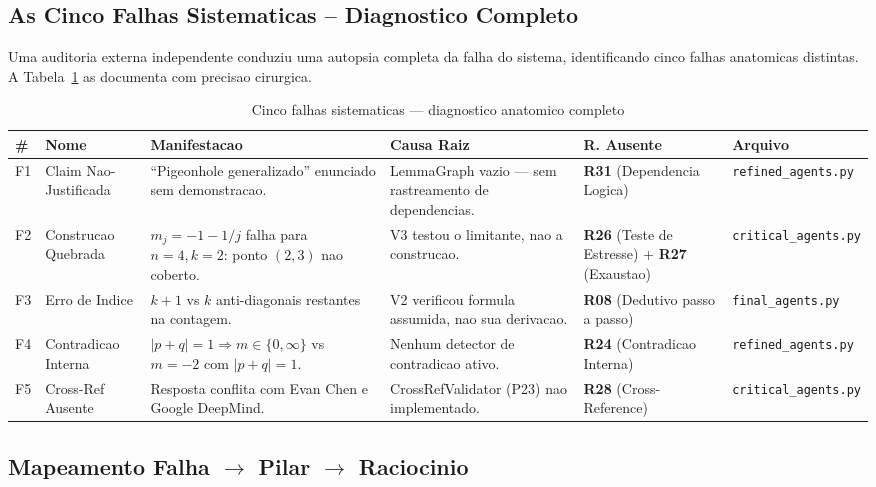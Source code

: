 \documentclass[5p]{elsarticle}
\begin{document}
\subsection{As Cinco Falhas Sistematicas -- Diagnostico Completo}

Uma auditoria externa independente \cite{corrigendum2026} conduziu uma autopsia
completa da falha do sistema, identificando cinco falhas anatomicas distintas.
A Tabela~\ref{tab:f5} as documenta com precisao cirurgica.


\begin{table}[H]
  \centering
  \caption{Cinco falhas sistematicas — diagnostico anatomico completo}
  \label{tab:f5}
  \scriptsize
  \setlength{\tabcolsep}{3pt}
  \begin{tabular}{p{0.3cm}p{1.5cm}p{3.2cm}p{3cm}p{2.2cm}p{2cm}}
    \toprule
    \textbf{\#} & \textbf{Nome} & \textbf{Manifestacao} & \textbf{Causa Raiz} & \textbf{R. Ausente} & \textbf{Arquivo}\\
    \midrule
    F1 & Claim Nao-Justificada & ``Pigeonhole generalizado'' enunciado sem demonstracao. & LemmaGraph vazio — sem rastreamento de dependencias. & \textbf{R31} (Dependencia Logica) & \texttt{refined\_agents.py}\\
    \rowcolor{yellowbg}
    F2 & Construcao Quebrada & $m_j=-1-1/j$ falha para $n=4,k=2$: ponto $(2,3)$ nao coberto. & V3 testou o limitante, nao a construcao. & \textbf{R26} (Teste de Estresse) + \textbf{R27} (Exaustao) & \texttt{critical\_agents.py}\\
    F3 & Erro de Indice & $k+1$ vs $k$ anti-diagonais restantes na contagem. & V2 verificou formula assumida, nao sua derivacao. & \textbf{R08} (Dedutivo passo a passo) & \texttt{final\_agents.py}\\
    \rowcolor{yellowbg}
    F4 & Contradicao Interna & $|p+q|=1\Rightarrow m\in\{0,\infty\}$ vs $m=-2$ com $|p+q|=1$. & Nenhum detector de contradicao ativo. & \textbf{R24} (Contradicao Interna) & \texttt{refined\_agents.py}\\
    F5 & Cross-Ref Ausente & Resposta conflita com Evan Chen e Google DeepMind. & CrossRefValidator (P23) nao implementado. & \textbf{R28} (Cross-Reference) & \texttt{critical\_agents.py}\\
    \bottomrule
  \end{tabular}
\end{table}


\subsection{Mapeamento Falha $\to$ Pilar $\to$ Raciocinio}
\end{document}
